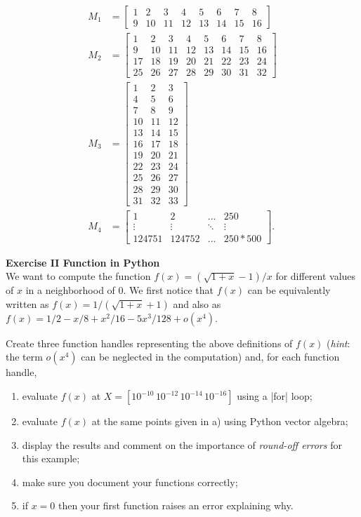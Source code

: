 \documentclass[11pt]{article}
\begin{document}
\begin{align*}
M_{1}  &= \begin{bmatrix} 1 & 2 & 3 & 4& 5 & 6 & 7 & 8 \\ 9 & 10 & 11 & 12 & 13 & 14 & 15 & 16  \end{bmatrix}  \\
M_{2}  &= \begin{bmatrix} 1 & 2 & 3 & 4& 5 & 6 & 7 & 8 \\ 9 & 10 & 11 & 12 & 13 & 14 & 15 & 16 \\ 17 & 18 & 19 & 20 & 21 & 22 & 23 & 24 \\ 25 & 26 & 27 & 28 & 29 & 30 & 31 & 32  \end{bmatrix}  \\
M_{3}  &= \begin{bmatrix} 1 & 2 & 3 \\ 4& 5 & 6 \\ 7 & 8 & 9 \\ 10 & 11 & 12 \\ 13 & 14 & 15 \\ 16 & 17 & 18 \\ 19 & 20 & 21 \\ 22 & 23 & 24 \\ 25 & 26 & 27 \\ 28 & 29 & 30 \\ 31 & 32 & 33  \end{bmatrix} \\
M_{4} &= \begin{bmatrix} 1 & 2 & \hdots & 250 \\ \vdots & \vdots & \ddots & \vdots \\ 124751 & 124752 & \hdots & 250*500 \end{bmatrix}.
\end{align*}


\bigskip

{\bf{Exercise II Function in Python}}\\

We want to compute the function $f(x) = (\sqrt{1+x}-1)/x$ for different values of $x$ in a neighborhood of 0. We first notice that $f(x)$ can be equivalently written as $f(x) = 1/(\sqrt{1+x}+1)$ and also as $f(x)=1/2 - x/8 + x^2/16 - 5x^3/128 + o(x^4)$.

Create three function handles representing the above definitions of $f(x)$ (\textit{hint}: the term $o(x^4)$ can be neglected in the computation) and, for each function handle,
\begin{enumerate}
\item evaluate $f(x)$ at $X = [10^{-10} \, 10^{-12} \, 10^{-14} \, 10^{-16}]$ using a |for| loop;
\item evaluate $f(x)$ at the same points given in a) using Python vector algebra;
\item display the results and comment on the importance of \textit{round-off errors} for this example;
\item make sure you document your functions correctly;
\item if $x=0$ then your first function raises an error explaining why.
\end{enumerate}
\end{document}
